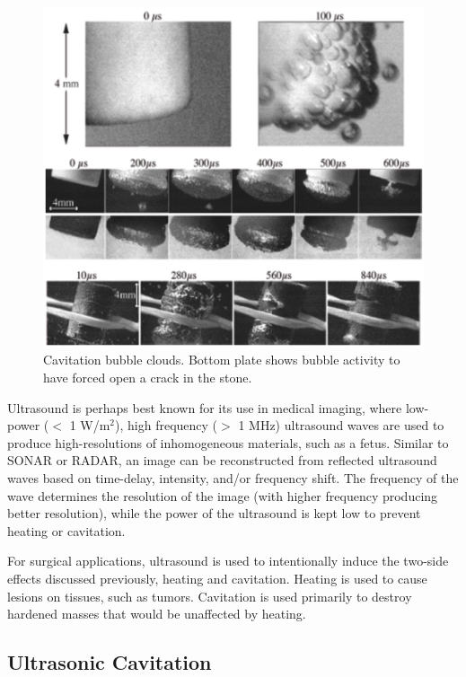 \documentclass[letter,12pt,titlepage]{article}
\begin{document}
	\begin{figure}[h!]
		\centering
		\includegraphics[width=\textwidth]{./PNGs/Cavitation.png}
		\caption{Cavitation bubble clouds. Bottom plate shows bubble activity to have forced open a crack in the stone. \cite{Bailey_2006}}
		\label{fig:cavitation}
	\end{figure}
	
	Ultrasound is perhaps best known for its use in medical imaging, where low-power ($<$ 1 W/m$^2$), high frequency ($>$ 1 MHz) ultrasound waves are used to produce high-resolutions of inhomogeneous materials, such as a fetus. Similar to SONAR or RADAR, an image can be reconstructed from reflected ultrasound waves based on time-delay, intensity, and/or frequency shift. The frequency of the wave determines the resolution of the image (with higher frequency producing better resolution), while the power of the ultrasound is kept low to prevent heating or cavitation.
	
	For surgical applications, ultrasound is used to intentionally induce the two-side effects discussed previously, heating and cavitation. Heating is used to cause lesions on tissues, such as tumors. Cavitation is used primarily to destroy hardened masses that would be unaffected by heating.
			
	\subsection{Ultrasonic Cavitation}
	
\end{document}
